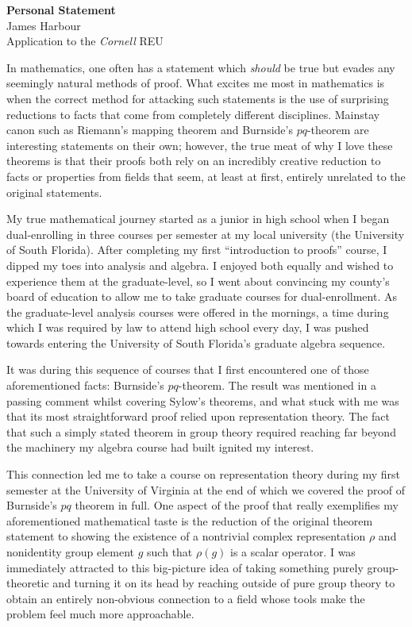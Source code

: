 \documentclass[11pt]{article}
\begin{document}
\begin{center}
  \textbf{Personal Statement}\\
  James Harbour \\
  Application to the \emph{Cornell} REU
\end{center}

In mathematics, one often has a statement which \emph{should} be true but evades any seemingly natural methods of proof. What excites me most in mathematics is when the correct method for attacking such statements is the use of surprising reductions to facts that come from completely different disciplines. Mainstay canon such as Riemann's mapping theorem and Burnside's $pq$-theorem are interesting statements on their own; however, the true meat of why I love these theorems is that their proofs both rely on an incredibly creative reduction to facts or properties from fields that seem, at least at first, entirely unrelated to the original statements.

My true mathematical journey started as a junior in high school when I began dual-enrolling in three courses per semester at my local university (the University of South Florida). After completing my first ``introduction to proofs'' course, I dipped my toes into analysis and algebra. I enjoyed both equally and wished to experience them at the graduate-level, so I went about convincing my county's board of education to allow me to take graduate courses for dual-enrollment. As the graduate-level analysis courses were offered in the mornings, a time during which I was required by law to attend high school every day, I was pushed towards entering the University of South Florida's graduate algebra sequence.

It was during this sequence of courses that I first encountered one of those aforementioned facts: Burnside's $pq$-theorem. The result was mentioned in a passing comment whilst covering Sylow's theorems, and what stuck with me was that its most straightforward proof relied upon representation theory. The fact that such a simply stated theorem in group theory required reaching far beyond the machinery my algebra course had built ignited my interest.

This connection led me to take a course on representation theory during my first semester at the University of Virginia at the end of which we covered the proof of Burnside's $pq$ theorem in full. One aspect of the proof that really exemplifies my aforementioned mathematical taste is the reduction of the original theorem statement to showing the existence of a nontrivial complex representation $\rho$ and nonidentity group element $g$ such that $\rho(g)$ is a scalar operator. I was immediately attracted to this big-picture idea of taking something purely group-theoretic and turning it on its head by reaching outside of pure group theory to obtain an entirely non-obvious connection to a field whose tools make the problem feel much more approachable.
\end{document}

